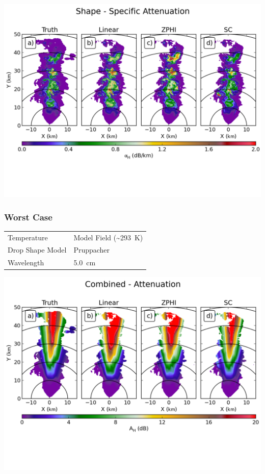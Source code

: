 \documentclass[red]{beamer}
\begin{document}
\begin{frame}
	\begin{center}
		\includegraphics[scale=0.55]{figures/C_Shape_Specific_Attenuation.png}
	\end{center}
\end{frame}

\begin{frame}
	\frametitle{Worst Case}
	\begin{center}
	    \begin{tabular}{ | l | l | }
	        \hline
	        Temperature & Model Field (\textasciitilde\SI{293}{\kelvin}) \\
	        Drop Shape Model & Pruppacher \\
	        Wavelength & \SI{5.0}{\centi\meter} \\
			\hline
	    \end{tabular}
	\end{center}	
\end{frame}

\begin{frame}
	\begin{center}
		\includegraphics[scale=0.55]{figures/C_Combined_Attenuation.png}
	\end{center}
\end{frame}
\end{document}
